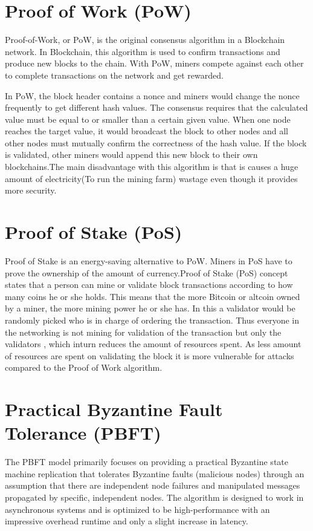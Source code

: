 \documentclass[12pt]{report}
\begin{document}
\section{Proof of Work (PoW)}
\par Proof-of-Work, or PoW, is the original consensus algorithm in a Blockchain network. In Blockchain, this algorithm is used to confirm transactions and produce new blocks to the chain. With PoW, miners compete against each other to complete transactions on the network and get rewarded.
\par  In PoW, the block header contains a nonce and miners would change the nonce frequently to get different hash values. The consensus requires that the calculated value must be equal to or smaller than a certain given value. When one node reaches the target value, it would broadcast the block to other nodes and all other nodes must mutually confirm the correctness of the hash value. If the block is validated, other miners would append this new block to their own blockchains.The main disadvantage with this algorithm is that is causes a huge amount of electricity(To run the mining farm) wastage even though it provides more security.
\section{Proof of Stake (PoS)}
\par Proof of Stake is an energy-saving alternative to PoW. Miners in PoS have to prove the ownership of the amount of currency.Proof of Stake (PoS) concept states that a person can mine or validate block transactions according to how many coins he or she holds. This means that the more Bitcoin or altcoin owned by a miner, the more mining power he or she has. In this a validator would be randomly picked who is in charge of ordering the transaction. Thus everyone in the networking is not mining for validation of the transaction but only the validators , which inturn reduces the amount of resources spent.
As less amount of resources are spent on validating the block it is more vulnerable for attacks compared to the Proof of Work algorithm.
\section{Practical Byzantine Fault Tolerance (PBFT)}
\par The PBFT model primarily focuses on providing a practical Byzantine state machine replication that tolerates Byzantine faults (malicious nodes) through an assumption that there are independent node failures and manipulated messages propagated by specific, independent nodes. The algorithm is designed to work in asynchronous systems and is optimized to be high-performance with an impressive overhead runtime and only a slight increase in latency.
\end{document}
